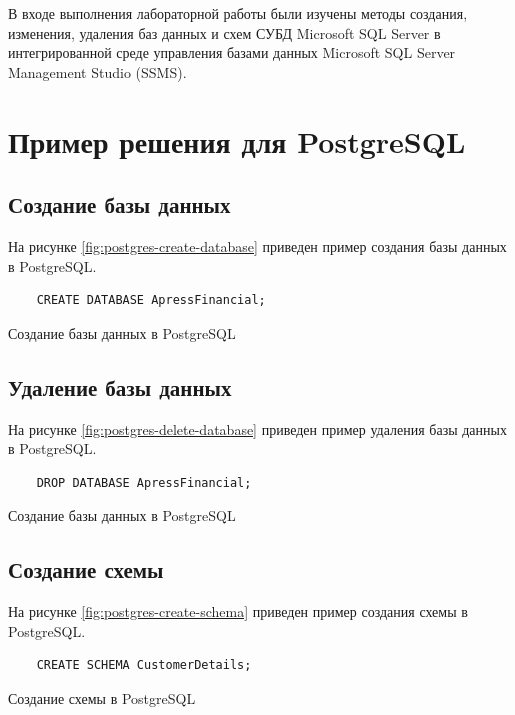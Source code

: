 \documentclass[a4paper, 14pt]{extarticle}
\newenvironment{code}{\captionsetup{type=figure}}{}
\begin{document}
В входе выполнения лабораторной работы были изучены методы создания, изменения,
удаления баз данных и схем СУБД Microsoft SQL Server в интегрированной среде
управления базами данных Microsoft SQL Server Management Studio (SSMS).

\section{Пример решения для PostgreSQL}

\subsection{Создание базы данных}

На рисунке \ref{fig:postgres-create-database} приведен пример создания базы
данных в PostgreSQL.

\begin{code}
  \begin{verbatim}
    CREATE DATABASE ApressFinancial;
  \end{verbatim}
  \caption{Создание базы данных в PostgreSQL}
  \label{fig:postgres-create-database}
\end{code}

\subsection{Удаление базы данных}

На рисунке \ref{fig:postgres-delete-database} приведен пример удаления базы
данных в PostgreSQL.

\begin{code}
  \begin{verbatim}
    DROP DATABASE ApressFinancial;
  \end{verbatim}
  \caption{Создание базы данных в PostgreSQL}
  \label{fig:postgres-delete-database}
\end{code}

\subsection{Создание схемы}

На рисунке \ref{fig:postgres-create-schema} приведен пример создания схемы в
PostgreSQL.

\begin{code}
  \begin{verbatim}
    CREATE SCHEMA CustomerDetails;
  \end{verbatim}
  \caption{Создание схемы в PostgreSQL}
  \label{fig:postgres-create-schema}
\end{code}
\end{document}

